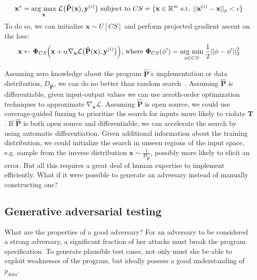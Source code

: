 %
\begin{equation}
\mathbf{x}^* = \underset{\mathbf{x}}{\operatorname{arg}\,\operatorname{max}}\;\mathcal{L}\big(\mathbf{\hat P}(\mathbf{x}), \mathbf{y}^{(i)}\big) \text{ subject to } CS = \{\mathbf{x} \in \mathbb{R}^m \text{ s.t. } ||\mathbf{x}^{(i)} - \mathbf{x}||_p    < \epsilon\}
\end{equation}
%
To do so, we can initialize $\mathbf{x} \sim U[CS]$ and perform projected gradient ascent on the loss:
%
\begin{equation}\label{eq:projected_gd}
\mathbf x \leftarrow \bm\Phi_{CS}\Big(\mathbf x + \alpha\mathbf\nabla_{\mathbf x} \mathcal{L}\big(\mathbf{\hat P}(\mathbf{x}), \mathbf{y}^{(i)}\big)\Big) \text{, where }
\bm\Phi_{CS}(\mathbf \phi') = \underset{\mathbf \phi \in CS}{\operatorname{arg}\,\operatorname{min}}\;\frac{1}{2}||\mathbf \phi - \mathbf \phi'||^2_2
\end{equation}
%

Assuming zero knowledge about the program $\mathbf{\hat P}$'s implementation or data distribution, $D_{\mathbf{\hat P}}$, we can do no better than random search~\citep{wolpert1997no}. Assuming $\mathbf{\hat P}$ is differentiable, given input-output values we can use zeroth-order optimization techniques to approximate $\nabla_{\mathbf{x}}\mathcal{L}$. Assuming $\mathbf{\hat P}$ is open source, we could use coverage-guided fuzzing to prioritize the search for inputs more likely to violate $\mathbf T$. If $\mathbf{\hat P}$ is both open source and differentiable, we can accelerate the search by using automatic differentiation. Given additional information about the training distribution, we could initialize the search in unseen regions of the input space, e.g. sample from the inverse distribution $\mathbf x \sim \frac{1}{D_{\mathbf{\hat P}}}$, possibly more likely to elicit an error. But all this requires a great deal of human expertise to implement efficiently. What if it were possible to generate an adversary instead of manually constructing one?

\subsection{Generative adversarial testing}

What are the properties of a good adversary? For an adversary to be considered a strong adversary, a significant fraction of her attacks must break the program specification. To generate plausible test cases, not only must she be able to exploit weaknesses of the program, but ideally possess a good understanding of $p_{data}$.

